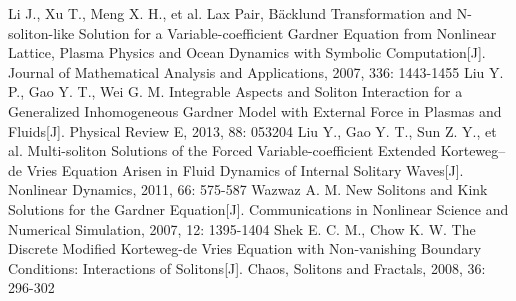 \begin{thebibliography}{0}
 Li J., Xu T., Meng X. H., et al. Lax Pair, B\"{a}cklund Transformation and N-soliton-like Solution for a Variable-coefficient Gardner Equation from Nonlinear Lattice, Plasma Physics and Ocean Dynamics with Symbolic Computation[J]. Journal of Mathematical Analysis and Applications, 2007, 336: 1443-1455%
     Liu Y. P., Gao Y. T., Wei G. M. Integrable Aspects and Soliton Interaction for a Generalized Inhomogeneous Gardner Model with External Force in Plasmas and Fluids[J]. Physical Review E, 2013, 88: 053204 %
     Liu Y., Gao Y. T., Sun Z. Y., et al. Multi-soliton Solutions of the Forced Variable-coefficient Extended Korteweg–de Vries Equation Arisen in Fluid Dynamics of Internal Solitary Waves[J]. Nonlinear Dynamics, 2011, 66: 575-587
     Wazwaz A. M. New Solitons and Kink Solutions for the Gardner Equation[J]. Communications in Nonlinear Science and Numerical Simulation, 2007, 12: 1395-1404
     Shek E. C. M., Chow K. W. The Discrete Modified Korteweg-de Vries Equation with Non-vanishing Boundary Conditions: Interactions of Solitons[J]. Chaos, Solitons and Fractals, 2008, 36: 296-302





\end{thebibliography}
